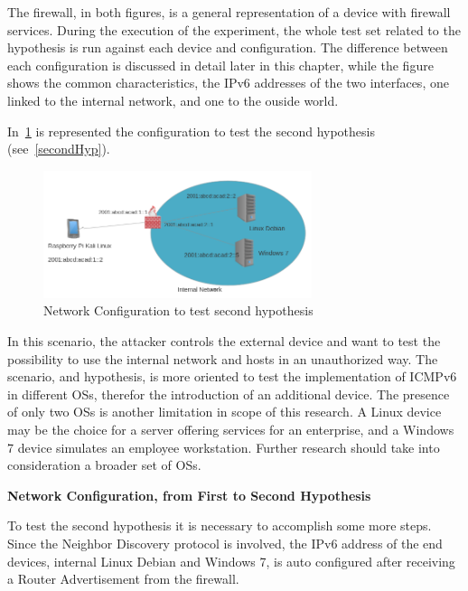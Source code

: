 \documentclass[12pt]{article}
\begin{document}
The firewall, in both figures, is a general representation of a device with firewall services. During the execution of the experiment, the whole test set related to the hypothesis is run against each device and configuration. The difference between each configuration is discussed in detail later in this chapter, while the figure shows the common characteristics, the IPv6 addresses of the two interfaces, one linked to the internal network, and one to the ouside world.

In~\cref{fig:netConfiguration2} is represented the configuration to test the second hypothesis (see~\ref{secondHyp}).

\begin{figure}[ht] 
\begin{center}
\includegraphics[width=0.7\textwidth]{networkTopology2}
\caption{Network Configuration to test second hypothesis}
\label{fig:netConfiguration2}
\end{center}
\end{figure}

In this scenario, the attacker controls the external device and want to test the possibility to use the internal network and hosts in an unauthorized way. The scenario, and hypothesis, is more oriented to test the implementation of ICMPv6 in different OSs, therefor the introduction of an additional device. The presence of only two OSs is another limitation in scope of this research. A Linux device may be the choice for a server offering services for an enterprise, and a Windows 7 device simulates an employee workstation. Further research should take into consideration a broader set of OSs.

\textbf{Network Configuration, from First to Second Hypothesis}
\label{subsub:netFromFirstToSecond}

To test the second hypothesis it is necessary to accomplish some more steps. Since the Neighbor Discovery protocol is involved, the IPv6 address of the end devices, internal Linux Debian and Windows 7, is auto configured after receiving a Router Advertisement from the firewall.
\end{document}
